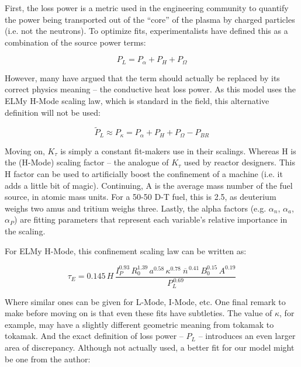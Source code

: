 First, the loss power is a metric used in the engineering community to quantify the power being transported out of the ``core'' of the plasma by charged particles (i.e. not the neutrons). \cite{process} To optimize fits, experimentalists have defined this as a combination of the source power terms:

\begin{equation}
	\label{eq:pl}
	P_L = P_\alpha + P_H + P_\Omega
\end{equation}

However, many have argued that the term should actually be replaced by its correct physics meaning -- the conductive heat loss power. As this model uses the ELMy H-Mode scaling law, which is standard in the field, this alternative definition will not be used:

\begin{equation}
	\tilde P_L \approx P_\kappa = P_\alpha + P_H + P_\Omega - P_{BR}
\end{equation}

Moving on, $K_\tau$ is simply a constant fit-makers use in their scalings. Whereas H is the (H-Mode) scaling factor -- the analogue of $K_\tau$ used by reactor designers. This H factor can be used to artificially boost the confinement of a machine (i.e. it adds a little bit of magic). Continuing, A is the average mass number of the fuel source, in atomic mass units. For a 50-50 D-T fuel, this is 2.5, as deuterium weighs two amus and tritium weighs three. Lastly, the alpha factors (e.g. $\alpha_n$, $\alpha_a$, $\alpha_P$) are fitting parameters that represent each variable's relative importance in the scaling. 

For ELMy H-Mode, this confinement scaling law can be written as:

\begin{equation}
	\tau_E = 0.145 \, H \, \frac{
		I_P^{0.93} \, R_0^{1.39} \, a^{0.58} \, \kappa^{0.78} \ \overline{n}^{\, 0.41} \, B_0^{0.15} \, A^{0.19}
	}{ P_L ^ {\,0.69} }
	\label{eq:tau_h}
\end{equation}

Where similar ones can be given for L-Mode, I-Mode, etc. One final remark to make before moving on is that even these fits have subtleties. The value of $\kappa$, for example, may have a slightly different geometric meaning from tokamak to tokamak. And the exact definition of loss power -- $P_L$ -- introduces an even larger area of discrepancy.  Although not actually used, a better fit for our model might be one from the author:

